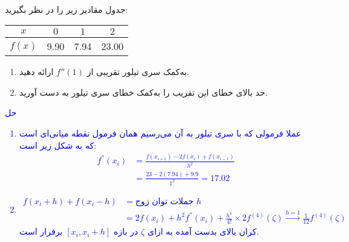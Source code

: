 \\
جدول مقادیر زیر را در نظر بگیرید:

\begin{latin}
\begin{table}[H]
  \begin{center}
    \begin{tabular}{c|c c c}
      \textbf{$x$} & $0$ & $1$ & $2$ \\
      \hline
      \textbf{$f(x)$} & 9.90 & 7.94 & 23.00 \\
    \end{tabular}
  \end{center}
\end{table}
\end{latin}

\begin{enumerate}
	\item
	به‌کمک سری تیلور تقریبی از
    $f''(1)$
    ارائه دهید.
	
	\item
	حد بالای خطای این تقریب را به‌کمک خطای سری تیلور به دست آورید.
\end{enumerate}
\textcolor{blue}{حل
\\
\begin{enumerate}
    \item
    عملا فرمولی که با سری تیلور به آن می‌رسیم همان فرمول نقطه میانی‌ای است که به شکل زیر است:
    \begin{align*}
        f^{''}(x_i) &= \frac{f(x_{i + 1}) - 2f(x_i) + f(x_{i - 1})}{h^2} \\
        &= \frac{23 - 2 (7.94) + 9.9}{1^2} = 17.02
    \end{align*}
    \item
    \begin{align*}
        f(x_i + h) + f(x_i - h) &= \text{جملات توان زوج 
        $h$} \\
        &= 2f(x_i) + h^2 f^{''}(x_i) + \frac{h^4}{4!} \times 2 f^{(4)}(\zeta) \xrightarrow{h = 1}  \frac{1}{12} f^{(4)}(\zeta)
    \end{align*}
    کران بالای بدست آمده به ازای 
    $\zeta$
    در بازه 
    $[x_i, x_i + h]$
    برقرار است.
\end{enumerate}
}